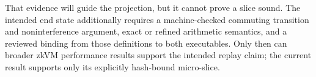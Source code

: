 That evidence will guide the projection, but it cannot prove a slice sound.
The intended end state additionally requires a machine-checked commuting
transition and noninterference argument, exact or refined arithmetic semantics,
and a reviewed binding from those definitions to both executables.  Only then
can broader zkVM performance results support the intended replay claim; the
current result supports only its explicitly hash-bound micro-slice.
